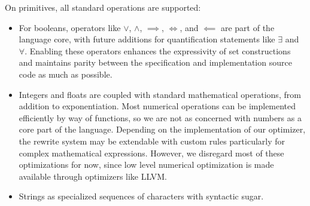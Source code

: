\documentclass{article}
\begin{document}
On primitives, all standard operations are supported:
\begin{itemize}
  \item For booleans, operators like $\lor$, $\land$, $\implies$, $\iff$, and $\impliedby$ are part of the language core, with future additions for quantification statements like $\exists$ and $\forall$. Enabling these operators enhances the expressivity of set constructions and maintains parity between the specification and implementation source code as much as possible.
  \item Integers and floats are coupled with standard mathematical operations, from addition to exponentiation. Most numerical operations can be implemented efficiently by way of functions, so we are not as concerned with numbers as a core part of the language. Depending on the implementation of our optimizer, the rewrite system may be extendable with custom rules particularly for complex mathematical expressions. However, we disregard most of these optimizations for now, since low level numerical optimization is made available through optimizers like LLVM.
  \item Strings as specialized sequences of characters with syntactic sugar.
\end{itemize}
\end{document}
